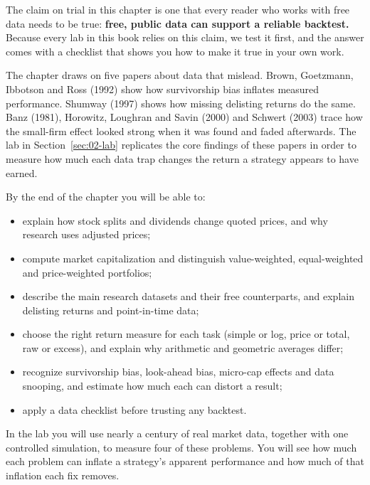 The claim on trial in this chapter is one that every reader who works with free data needs to be true: \textbf{free, public data can support a reliable backtest.} Because every lab in this book relies on this claim, we test it first, and the answer comes with a checklist that shows you how to make it true in your own work.


The chapter draws on five papers about data that mislead. Brown, Goetzmann, Ibbotson and Ross (1992) show how survivorship bias inflates measured performance. Shumway (1997) shows how missing delisting returns do the same. Banz (1981), Horowitz, Loughran and Savin (2000) and Schwert (2003) trace how the small-firm effect looked strong when it was found and faded afterwards. The lab in Section~\ref{sec:02-lab} replicates the core findings of these papers in order to measure how much each data trap changes the return a strategy appears to have earned.

By the end of the chapter you will be able to:

\begin{itemize}
  \item explain how stock splits and dividends change quoted prices, and why research uses adjusted prices;
  \item compute market capitalization and distinguish value-weighted, equal-weighted and price-weighted portfolios;
  \item describe the main research datasets and their free counterparts, and explain delisting returns and point-in-time data;
  \item choose the right return measure for each task (simple or log, price or total, raw or excess), and explain why arithmetic and geometric averages differ;
  \item recognize survivorship bias, look-ahead bias, micro-cap effects and data snooping, and estimate how much each can distort a result;
  \item apply a data checklist before trusting any backtest.
\end{itemize}

In the lab you will use nearly a century of real market data, together with one controlled simulation, to measure four of these problems. You will see how much each problem can inflate a strategy's apparent performance and how much of that inflation each fix removes.

